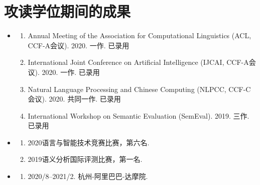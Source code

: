 \chapter{攻读学位期间的成果}

\begin{itemize}
	\setlength{\itemsep}{5pt}
	
	\item \textbf{\heiti{}}
	      \begin{enumerate}
	      	\setlength{\itemsep}{-\itemsep}  %
	      	
	      	\item Annual Meeting of the Association for Computational Linguistics (ACL, CCF-A会议). 2020. 一作. 已录用
	      	\item International Joint Conference on Artificial Intelligence (IJCAI, CCF-A会议). 2020. 一作. 已录用
	      	\item Natural Language Processing and Chinese Computing (NLPCC, CCF-C会议). 2020. 共同一作. 已录用
	      	\item International Workshop on Semantic Evaluation (SemEval). 2019. 三作. 已录用
	      	      
	      \end{enumerate}
	      
	\item \textbf{\heiti{}}
	      \begin{enumerate}
	      	\item 2020语言与智能技术竞赛比赛，第六名.
	      	\item 2019语义分析国际评测比赛，第一名.
	      \end{enumerate}
	      
	\item \textbf{\heiti{}}
	      \begin{enumerate}
	      	\item \textsc{2020/8--2021/2}. 杭州-阿里巴巴-达摩院.
	      \end{enumerate}
	      
\end{itemize}
